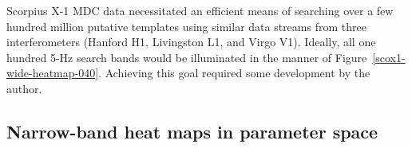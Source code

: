 Scorpius X-1 MDC data necessitated an efficient means of searching over a few hundred million putative templates using similar data streams from three interferometers (Hanford H1, Livingston L1, and Virgo V1).
Ideally, all one hundred 5-Hz search bands would be illuminated in the manner of Figure~\ref{scox1-wide-heatmap-040}.
Achieving this goal required some development by the author.


\subsection{Narrow-band heat maps in parameter space}


